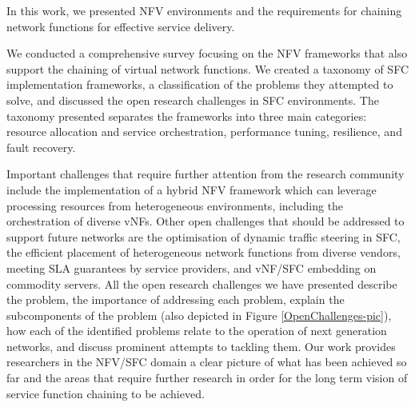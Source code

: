 \documentclass[futureinternet,review,accept,pdftex,moreauthors]{Definitions/mdpi}
\begin{document}
In this work, we presented NFV environments and the requirements for chaining network functions for effective service delivery.

We conducted a comprehensive survey focusing on the NFV frameworks that also support the chaining of virtual network functions. We created a taxonomy of SFC implementation frameworks, a classification of the problems they attempted to solve, and discussed the open research challenges in SFC environments. The taxonomy presented separates the frameworks into three main categories: resource allocation and service orchestration, performance tuning, resilience, and fault recovery.

Important challenges that require further attention from the research community include the implementation of a hybrid NFV framework which can leverage processing resources from heterogeneous environments, including the orchestration of diverse vNFs. Other open challenges that should be addressed to support future networks are the optimisation of dynamic traffic steering in SFC, the efficient placement of heterogeneous network functions from diverse vendors, meeting SLA guarantees by service providers, and vNF/SFC embedding on commodity servers. 
All the open research challenges we have presented describe the problem, the importance of addressing each problem, explain the subcomponents of the problem (also depicted in Figure \ref{OpenChallenges-pic}), how each of the identified problems relate to the operation of next generation networks, and discuss prominent attempts to tackling them. Our work provides researchers in the NFV/SFC domain a clear picture of what has been achieved so far and the areas that require further research in order for the long term vision of service function chaining to be achieved.  
\vspace{6pt} 


\end{document}
